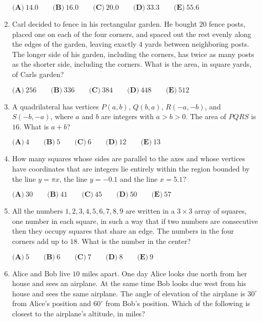 \documentclass{article}
\begin{document}
\begin{enumerate}[label=\arabic*., itemsep=0.5em]
\(\textbf{(A)}\ 14.0\qquad\textbf{(B)}\ 16.0\qquad\textbf{(C)}\ 20.0\qquad\textbf{(D)}\ 33.3\qquad\textbf{(E)}\ 55.6\)\par \vspace{0.5em}\item Carl decided to fence in his rectangular garden. He bought \(20\) fence posts, placed one on each of the four corners, and spaced out the rest evenly along the edges of the garden, leaving exactly \(4\) yards between neighboring posts. The longer side of his garden, including the corners, has twice as many posts as the shorter side, including the corners. What is the area, in square yards, of Carls garden?

\(\textbf{(A)}\ 256\qquad\textbf{(B)}\ 336\qquad\textbf{(C)}\ 384\qquad\textbf{(D)}\ 448\qquad\textbf{(E)}\ 512\)\par \vspace{0.5em}\item A quadrilateral has vertices \(P(a,b)\), \(Q(b,a)\), \(R(-a, -b)\), and \(S(-b, -a)\), where \(a\) and \(b\) are integers with \(a>b>0\). The area of \(PQRS\) is \(16\). What is \(a+b\)?

\(\textbf{(A)}\ 4 \qquad\textbf{(B)}\ 5 \qquad\textbf{(C)}\ 6 \qquad\textbf{(D)}\ 12  \qquad\textbf{(E)}\ 13\)\par \vspace{0.5em}\item How many squares whose sides are parallel to the axes and whose vertices have coordinates that are integers lie entirely within the region bounded by the line \(y=\pi x\), the line \(y=-0.1\) and the line \(x=5.1?\)

\(\textbf{(A)}\ 30 \qquad
\textbf{(B)}\ 41 \qquad
\textbf{(C)}\ 45 \qquad
\textbf{(D)}\ 50 \qquad
\textbf{(E)}\ 57\)\par \vspace{0.5em}\item All the numbers \(1, 2, 3, 4, 5, 6, 7, 8, 9\) are written in a \(3\times3\) array of squares, one number in each square, in such a way that if two numbers are consecutive then they occupy squares that share an edge. The numbers in the four corners add up to \(18\). What is the number in the center?

\(\textbf{(A)}\ 5\qquad\textbf{(B)}\ 6\qquad\textbf{(C)}\ 7\qquad\textbf{(D)}\ 8\qquad\textbf{(E)}\ 9\)\par \vspace{0.5em}\item Alice and Bob live \(10\) miles apart. One day Alice looks due north from her house and sees an airplane. At the same time Bob looks due west from his house and sees the same airplane. The angle of elevation of the airplane is \(30^\circ\) from Alice's position and \(60^\circ\) from Bob's position. Which of the following is closest to the airplane's altitude, in miles?


\end{enumerate}
\end{document}
